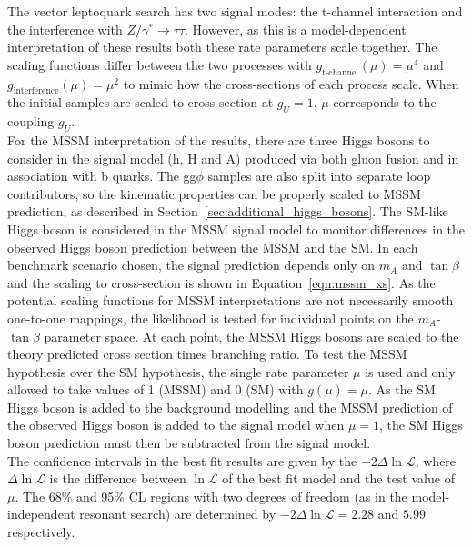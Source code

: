 The vector leptoquark search has two signal modes: the t-channel interaction and the interference with $Z/\gamma^* \rightarrow \tau\tau$. 
However, as this is a model-dependent interpretation of these results both these rate parameters scale together.
The scaling functions differ between the two processes with $g_{\text{t-channel}}(\mu) = \mu^4$ and $g_{\text{interference}}(\mu) = \mu^2$ to mimic how the cross-sections of each process scale.
When the initial samples are scaled to cross-section at $g_{U}=1$, $\mu$ corresponds to the coupling $g_{U}$. \\

For the \ac{MSSM} interpretation of the results, there are three Higgs bosons to consider in the signal model (h, H and A) produced via both gluon fusion and in association with b quarks.
The gg$\phi$ samples are also split into separate loop contributors, so the kinematic properties can be properly scaled to \ac{MSSM} prediction, as described in Section~\ref{sec:additional_higgs_bosons}.
The \ac{SM}-like Higgs boson is considered in the \ac{MSSM} signal model to monitor differences in the observed Higgs boson prediction between the \ac{MSSM} and the \ac{SM}.
In each benchmark scenario chosen, the signal prediction depends only on $m_{A}$ and $\tan\beta$ and the scaling to cross-section is shown in Equation~\ref{eqn:mssm_xs}.
As the potential scaling functions for \ac{MSSM} interpretations are not necessarily smooth one-to-one mappings, the likelihood is tested for individual points on the $m_{A}$-$\tan\beta$ parameter space.
At each point, the \ac{MSSM} Higgs bosons are scaled to the theory predicted cross section times branching ratio.
To test the \ac{MSSM} hypothesis over the \ac{SM} hypothesis, the single rate parameter $\mu$ is used and only allowed to take values of 1 (\ac{MSSM}) and 0 (\ac{SM}) with $g(\mu)=\mu$.
As the SM Higgs boson is added to the background modelling and the \ac{MSSM} prediction of the observed Higgs boson is added to the signal model when $\mu=1$, the \ac{SM} Higgs boson prediction must then be subtracted from the signal model. \\

The confidence intervals in the best fit results are given by the $-2\Delta\ln\mathcal{L}$, where $\Delta\ln\mathcal{L}$ is the difference between $\ln\mathcal{L}$ of the best fit model and the test value of $\mu$. 
The 68\% and 95\% \ac{CL} regions with two degrees of freedom (as in the model-independent resonant search) are determined by $-2\Delta\ln\mathcal{L} = 2.28$ and $5.99$ respectively. \\

